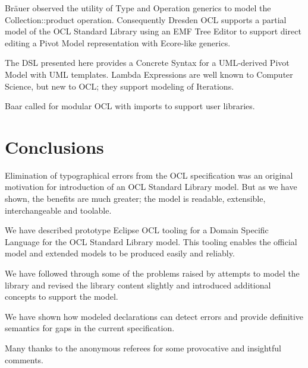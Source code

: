 \documentclass{eceasst}
\begin{document}
Br\"{a}uer\cite{Pivot} observed the utility of Type and Operation generics to model the Collection::product operation. Consequently Dresden OCL supports a partial model of the OCL Standard Library using an EMF Tree Editor to support direct editing a Pivot Model representation with Ecore-like generics.

The DSL presented here provides a Concrete Syntax for a UML-derived Pivot Model\cite{OCL-UML} with UML templates. Lambda Expressions are well known to Computer Science, but new to OCL; they support modeling of Iterations.

Baar\cite{Baar} called for modular OCL with imports to support user libraries.

\section{Conclusions}

Elimination of typographical errors from the OCL specification was an original motivation for introduction of an OCL Standard Library model. But as we have shown, the benefits are much greater; the model is readable, extensible, interchangeable and toolable.

We have described prototype Eclipse OCL tooling for a Domain Specific Language for the OCL Standard Library model. This tooling enables the official model and extended models to be produced easily and reliably.

We have followed through some of the problems raised by attempts to model the library and revised the library content slightly and introduced additional concepts to support the model.

We have shown how modeled declarations can detect errors and provide definitive semantics for gaps in the current specification.

Many thanks to the anonymous referees for some provocative and insightful comments.

\nocite{*}


\end{document}
